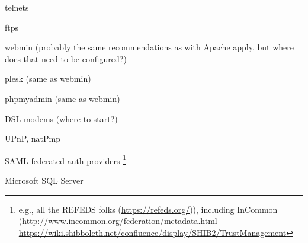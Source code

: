 \begin{multicols}{3}
\begin{itemize*}
  \item telnets
  \item ftps
  \item webmin (probably the same recommendations as with Apache apply, but where does that need to be configured?)
  \item plesk (same as webmin)
  \item phpmyadmin (same as webmin)
  \item DSL modems (where to start?)
  \item UPnP, natPmp
  \item SAML federated auth providers \footnote{e.g., all the REFEDS folks (\url{https://refeds.org/})), including InCommon (\url{http://www.incommon.org/federation/metadata.html}
  \url{https://wiki.shibboleth.net/confluence/display/SHIB2/TrustManagement} }
  \item Microsoft SQL Server
\end{itemize*}
\end{multicols}

